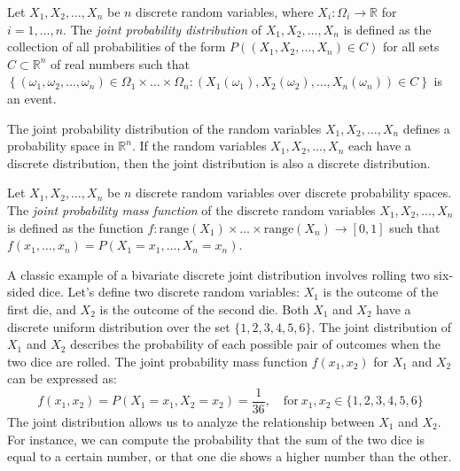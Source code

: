 \begin{definition}
Let $X_1, X_2, \ldots, X_n$ be $n$ discrete random variables, where $X_i : \Omega_i \rightarrow \mathbb{R}$ for $i=1, \ldots, n$. The \emph{joint probability distribution} of $X_1, X_2, \ldots, X_n$ is defined as the collection of all probabilities of the form $P\left( \left( X_1, X_2, \ldots, X_n \right) \in C \right)$ for all sets $C \subset \mathbb{R}^n$ of real numbers such that $\left\{ \left( \omega_1, \omega_2, \ldots, \omega_n \right) \in \Omega_1 \times \ldots \times \Omega_n : \left( X_1 \left( \omega_1 \right), X_2 \left( \omega_2 \right), \ldots, X_n \left( \omega_n \right) \right) \in C \right\}$ is an event.
\end{definition}

The joint probability distribution of the random variables $X_1, X_2, \ldots, X_n$ defines a probability space in $\mathbb{R}^n$. If the random variables $X_1, X_2, \ldots, X_n$ each have a discrete distribution, then the joint distribution is also a discrete distribution.

\begin{definition}
Let $X_1, X_2, \ldots, X_n$ be $n$ discrete random variables over discrete probability spaces. The \emph{joint probability mass function} of the discrete random variables $X_1, X_2, \ldots, X_n$ is defined as the function $f : \text{range} \left( X_1 \right) \times \ldots \times \text{range} \left( X_n \right) \rightarrow [0, 1]$ such that $f \left( x_1, \ldots, x_n \right) = P \left( X_1 = x_1, \ldots, X_n = x_n \right)$.
\end{definition}

\begin{example}
A classic example of a bivariate discrete joint distribution involves rolling two six-sided dice. Let's define two discrete random variables: $X_1$ is the outcome of the first die, and $X_2$ is the outcome of the second die. Both $X_1$ and $X_2$ have a discrete uniform distribution over the set $\{1, 2, 3, 4, 5, 6\}$. The joint distribution of $X_1$ and $X_2$ describes the probability of each possible pair of outcomes when the two dice are rolled. The joint probability mass function $f(x_1, x_2)$ for $X_1$ and $X_2$ can be expressed as:
\[
f(x_1, x_2) = P(X_1 = x_1, X_2 = x_2) = \frac{1}{36}, \quad \text{for} \ x_1, x_2 \in \{1, 2, 3, 4, 5, 6\}
\]
The joint distribution allows us to analyze the relationship between $X_1$ and $X_2$. For instance, we can compute the probability that the sum of the two dice is equal to a certain number, or that one die shows a higher number than the other.
\end{example}

